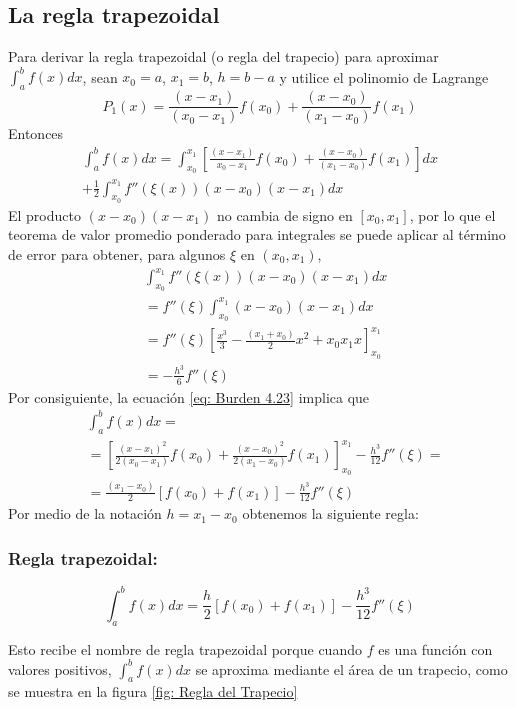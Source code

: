 \subsection{La regla trapezoidal}
Para derivar la regla trapezoidal (o regla del trapecio) para aproximar $\int_{a}^{b} f(x) dx$, sean $x_0 = a$, $x_1 = b$, $h = b - a$ y utilice el polinomio de Lagrange
\[ P_1(x) = \frac{(x - x_1)}{(x_0 - x_1)} f(x_0) + \frac{(x - x_0)}{(x_1 - x_0)} f(x_1) \]
Entonces
\begin{multline}
    \label{eq: Burden 4.23}
    \int_{a}^{b} f(x) dx = \int_{x_0}^{x_1} \left[ \frac{(x - x_1)}{x_0 - x_1} f(x_0) + \frac{(x - x_0)}{(x_1 - x_0)} f(x_1) \right] dx \\
    + \frac{1}{2} \int_{x_0}^{x_1} f''(\xi(x)) (x - x_0) (x - x_1) dx
\end{multline}
El producto $(x - x_0) (x - x_1)$ no cambia de signo en $[x_0, x_1]$, por lo que el teorema de valor promedio ponderado para integrales se puede aplicar al término de error para obtener, para algunos $\xi$ en $(x_0, x_1)$,
\begin{align*}
    & \int_{x_0}^{x_1} f''(\xi(x)) (x - x_0) (x - x_1) dx \\
    & = f''(\xi) \int_{x_0}^{x_1} (x - x_0) (x - x_1) dx \\
    & = f''(\xi) \left[ \frac{x^3}{3} - \frac{(x_1 + x_0)}{2}x^2 + x_0 x_1 x \right]_{x_0}^{x_1} \\
    & = - \frac{h^3}{6} f''(\xi)
\end{align*}
Por consiguiente, la ecuación \ref{eq: Burden 4.23} implica que
\begin{align*}
    & \int_{a}^{b} f(x) dx = \\
    & = \left[ \frac{(x - x_1)^2}{2 (x_0 - x_1)} f(x_0) + \frac{(x - x_0)^2}{2(x_1 - x_0)} f(x_1) \right]_{x_0}^{x_1} - \frac{h^3}{12} f''(\xi) = \\
    & = \frac{(x_1 - x_0)}{2} [f(x_0) + f(x_1)] - \frac{h^3}{12} f''(\xi)
\end{align*}
Por medio de la notación $h = x_1 - x_0$ obtenemos la siguiente regla:
\subsubsection{Regla trapezoidal:}
\[ \int_{a}^{b} f(x) dx = \frac{h}{2} [f(x_0) + f(x_1)] - \frac{h^3}{12} f''(\xi) \]

Esto recibe el nombre de regla trapezoidal porque cuando $f$ es una función con valores positivos, $\int_{a}^{b}f(x) dx$ se aproxima mediante el área de un trapecio, como se muestra en la figura \ref{fig: Regla del Trapecio}

